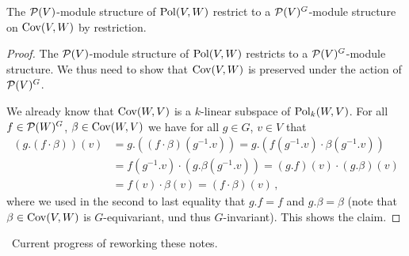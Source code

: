 \begin{proposition}
  The $\mathcal{P}(V)$-module structure of $\operatorname{Pol}(V,W)$ restrict to a $\mathcal{P}(V)^G$-module structure on $\operatorname{Cov}(V,W)$ by restriction.
\end{proposition}
\begin{proof}
  The $\mathcal{P}(V)$-module structure of $\operatorname{Pol}(V,W)$ restricts to a $\mathcal{P}(V)^G$-module structure.
  We thus need to show that $\operatorname{Cov}(V,W)$ is preserved under the action of $\mathcal{P}(V)^G$.
  
  We already know that $\operatorname{Cov}(W,V)$ is a $k$-linear subspace of $\operatorname{Pol}_k(W,V)$.
  For all $f \in \mathcal{P}(W)^G$, $\beta \in \operatorname{Cov}(W,V)$ we have for all $g \in G$, $v \in V$ that
  \begin{align*}
        (g.(f \cdot \beta))(v)
    &=  g.\left( (f \cdot \beta) \left( g^{-1}.v \right) \right)
     =  g.\left(
                f\left( g^{-1}.v \right)
          \cdot \beta\left( g^{-1}.v \right)
        \right) \\
    &=        f\left( g^{-1}.v \right)
        \cdot \left(
                g.\beta\left( g^{-1}.v \right)
              \right)
     =  (g.f)(v) \cdot (g.\beta)(v) \\
    &=  f(v) \cdot \beta(v)
     =  (f \cdot \beta)(v) \,,
  \end{align*}
  where we used in the second to last equality that $g.f = f$ and $g.\beta = \beta$ (note that $\beta \in \operatorname{Cov}(V,W)$ is $G$-equivariant, und thus $G$-invariant).
  This shows the claim.
\end{proof}


\noindent\hrulefill \, Current progress of reworking these notes. \hrulefill
